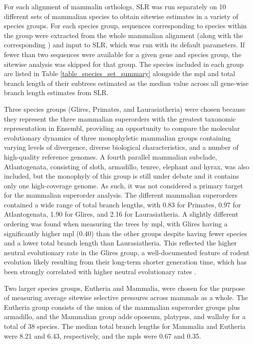 For each alignment of mammalin orthologs, SLR was run separately on 10
different sets of mammalian species to obtain sitewise estimates in a
variety of species groups. For each species group, sequences
corresponding to species within the group were extracted from the
whole mammalian alignment (along with the corresponding \subtr) and
input to SLR, which was run with its default parameters. If fewer than
two sequences were available for a given gene and species group, the
sitewise analysis was skipped for that group. The species included in
each group are listed in Table \ref{table_species_set_summary}
alongside the \ac{mpl} and total branch length of their subtrees
estimated as the median value across all \ntrees gene-wise \ds branch
length estimates from SLR.

Three species groups (Glires, Primates, and Laurasiatheria) were
chosen because they represent the three mammalian superorders with the
greatest taxonomic representation in Ensembl, providing an opportunity
to compare the molecular evolutionary dynamics of three monophyletic
mammalian groups containing varying levels of divergence, diverse
biological characteristics, and a number of high-quality reference
genomes. A fourth parallel mammalian subclade, Atlantogenata,
consisting of sloth, armadillo, tenrec, elephant and hyrax, was also
included, but the monophyly of this group is still under debate
\citep{Murphy2007,Churakov2009} and it contains only one high-coverage
genome. As such, it was not considered a primary target for the
mammalian superorder analysis. The different mammalian superorders
contained a wide range of total branch lengths, with 0.83 for
Primates, 0.97 for Atlantogenata, 1.90 for Glires, and 2.16 for
Laurasiatheria. A slightly different ordering was found when measuring
the trees by \ac{mpl}, with Glires having a significantly higher
\ac{mpl} (0.40) than the other groups despite having fewer species and
a lower total branch length than Laurasiatheria. This reflected the
higher neutral evolutionary rate in the Glires group, a
well-documented feature of rodent evolution likely resulting from
their long-term shorter generation time, which has been strongly
correlated with higher neutral evolutionary rates
\citep{Nikolaev2007,Smith2008}.

Two larger species groups, Eutheria and Mammalia, were chosen for the
purpose of measuring average sitewise selective pressures across
mammals as a whole. The Eutheria group consists of the union of the
mammalian superorder groups plus armadillo, and the Mammalian group
adds opossum, platypus, and wallaby for a total of 38 species. The
median total branch lengths for Mammalia and Eutheria were 8.21 and
6.43, respectively, and the \ac{mpl}s were 0.67 and 0.35.

